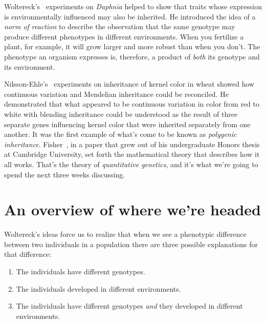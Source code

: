 Woltereck's~\cite{Woltereck-1909} experiments on {\it Daphnia\/}
helped to show that traits whose expression is environmentally
influenced may also be inherited. He introduced the idea of a {\it
  norm of reaction} to describe the observation that the same genotype
may produce different phenotypes in different environments. When you
fertilize a plant, for example, it will grow larger and more robust
than when you don't. The phenotype an organism expresses is,
therefore, a product of {\it both\/} its genotype and its
environment.

Nilsson-Ehle's~\cite{NilssonEhle-1909} experiments on inheritance of
kernel color in wheat showed how continuous variation and Mendelian
inheritance could be reconciled. He demonstrated that what appeared to
be continuous variation in color from red to white with blending
inheritance could be understood as the result of three separate genes
influencing kernel color that were inherited separately from one
another. It was the first example of what's come to be known as {\it
  polygenic inheritance}. Fisher~\cite{Fisher-1918}, in a paper that
grew out of his undergraduate Honors thesis at Cambridge University,
set forth the mathematical theory that describes how it all
works. That's the theory of {\it quantitative genetics}, and it's what
we're going to spend the next three weeks discussing.

\section*{An overview of where we're headed}

Woltereck's ideas force us to realize that when we see a phenotypic
difference between two individuals in a population there are three
possible explanations for that difference:

\begin{enumerate}

\item The individuals have different genotypes.

\item The individuals developed in different environments. 

\item The individuals have different genotypes {\it and\/} they
developed in different environments.

\end{enumerate}

